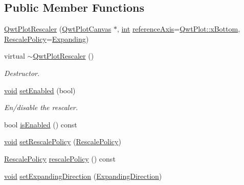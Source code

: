 \subsection*{Public Member Functions}
\begin{DoxyCompactItemize}
\item 
\hyperlink{class_qwt_plot_rescaler_a26e77e1fc7537f6043ddb37006dd8434}{Qwt\-Plot\-Rescaler} (\hyperlink{class_qwt_plot_canvas}{Qwt\-Plot\-Canvas} $\ast$, \hyperlink{ioapi_8h_a787fa3cf048117ba7123753c1e74fcd6}{int} \hyperlink{class_qwt_plot_rescaler_ae495168aec756dd617a5ad0c24e0eede}{reference\-Axis}=\hyperlink{class_qwt_plot_a81df699dcf9dde0752c0726b5f31e271ad5566960e78f2473c1a1e853def4c4ac}{Qwt\-Plot\-::x\-Bottom}, \hyperlink{class_qwt_plot_rescaler_a6a614b832876a7641cb5410ba81d9d6a}{Rescale\-Policy}=\hyperlink{class_qwt_plot_rescaler_a6a614b832876a7641cb5410ba81d9d6aac0b9db1ea3c5666792c2a9813ca5d7e1}{Expanding})
\item 
virtual \hyperlink{class_qwt_plot_rescaler_ae34a0dbae9074c211f36c765142d8ddd}{$\sim$\-Qwt\-Plot\-Rescaler} ()
\begin{DoxyCompactList}\small\item\em Destructor. \end{DoxyCompactList}\item 
\hyperlink{group___u_a_v_objects_plugin_ga444cf2ff3f0ecbe028adce838d373f5c}{void} \hyperlink{class_qwt_plot_rescaler_a6f1c886d127ec4943552170dc63edf29}{set\-Enabled} (bool)
\begin{DoxyCompactList}\small\item\em En/disable the rescaler. \end{DoxyCompactList}\item 
bool \hyperlink{class_qwt_plot_rescaler_afdafabbb963aa5b13ce4a6bae33958da}{is\-Enabled} () const 
\item 
\hyperlink{group___u_a_v_objects_plugin_ga444cf2ff3f0ecbe028adce838d373f5c}{void} \hyperlink{class_qwt_plot_rescaler_ae6b7df41b5387d0aed532559546e40b6}{set\-Rescale\-Policy} (\hyperlink{class_qwt_plot_rescaler_a6a614b832876a7641cb5410ba81d9d6a}{Rescale\-Policy})
\item 
\hyperlink{class_qwt_plot_rescaler_a6a614b832876a7641cb5410ba81d9d6a}{Rescale\-Policy} \hyperlink{class_qwt_plot_rescaler_adceb6d094c1db33c1ef23e18e1b49185}{rescale\-Policy} () const 
\item 
\hyperlink{group___u_a_v_objects_plugin_ga444cf2ff3f0ecbe028adce838d373f5c}{void} \hyperlink{class_qwt_plot_rescaler_aa2ecffbc14d951ab9f1809c14bc4e21b}{set\-Expanding\-Direction} (\hyperlink{class_qwt_plot_rescaler_a1c314e9513cef076a79381111aa67585}{Expanding\-Direction})

\end{DoxyCompactItemize}
